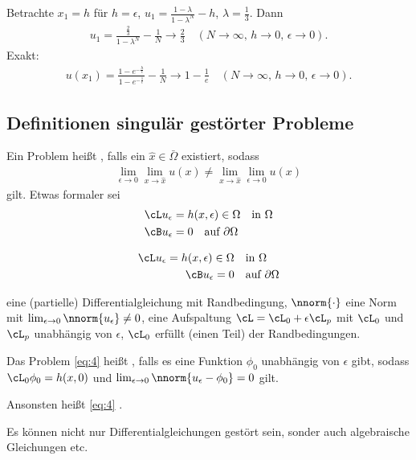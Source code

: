 \begin{enumerate}
Betrachte $x_{1} = h$ für $h = \epsilon$, $u_{1} = \frac {1 - \lambda}{1 - \lambda^{N}} - h$, $\lambda = \frac 13$. Dann
\begin{align}
  u_{1} = \frac {\frac 23}{1 - \lambda^{N}} - \frac 1N \to \frac 23 \quad (N \to \infty, \, h \to 0,\,  \epsilon \to 0). 
\end{align}
Exakt:
\begin{align*}
  u(x_{1}) = \frac {1 - e^{ - \frac h \epsilon}}{1 - e^{- \frac 1 \epsilon}} - \frac 1 N \to 1 - \frac 1 e \quad (N \to \infty, \, h \to 0,\,  \epsilon \to 0). 
\end{align*}


\end{enumerate}

\subsection{Definitionen singulär gestörter Probleme}
\begin{definition}
  Ein Problem heißt , falls ein $\hat x \in \bar \Omega$ existiert, sodass
  \begin{align*}
    \lim_{\epsilon \to 0} \lim_{x \to \hat x} u(x) \neq \lim_{x \to \hat x} \lim_{\epsilon \to 0}  u(x) 
  \end{align*}
gilt. Etwas formaler sei
\begin{align}\label{eq:4}
  \cL u_{\epsilon} &= h(x, \epsilon) \in \Omega \quad \text{in } \Omega\\
  \cB u_{\epsilon} &= 0 \quad \text{auf } \partial \Omega \notag
\end{align}


\begin{align*}
  \cL u_{\epsilon} = h(x, \epsilon) \in \Omega \quad &\text{in } \Omega\\
  \cB u_{\epsilon} = 0 \quad &\text{auf } \partial \Omega 
\end{align*}


eine (partielle) Differentialgleichung mit Randbedingung,  $\nnorm {\cdot}$ eine Norm mit $\lim_{\epsilon \to 0} \nnorm{u_{\epsilon}} \neq 0$, eine Aufspaltung $\cL = \cL_{0} + \epsilon \cL_{p}$ mit $\cL_{0}$ und $\cL_{p}$ unabhängig von $\epsilon$, $\cL_{0}$ erfüllt (einen Teil) der Randbedingungen. 
\end{definition}
\begin{definition} \label{def:1-2}
  Das Problem \eqref{eq:4} heißt , falls es eine Funktion $\phi_{0}$ unabhängig von $\epsilon$ gibt, sodass $\cL_{0}\phi_{0} = h(x, 0)$ und $\lim_{\epsilon\to 0} \nnorm{u_{\epsilon} - \phi_{0}} = 0$ gilt. 

Ansonsten heißt \eqref{eq:4} . 
\end{definition}
Es können nicht nur Differentialgleichungen gestört sein, sonder auch algebraische Gleichungen etc.

